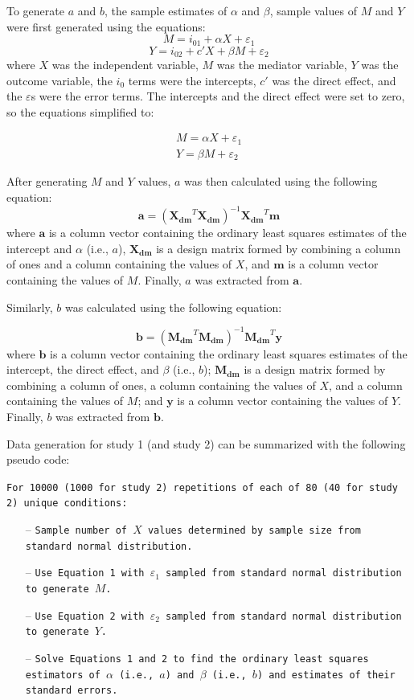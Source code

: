 \documentclass[10,a4paperpaper,]{article}
\begin{document}
To generate \(a\) and \(b\), the sample estimates of \(\alpha\) and
\(\beta\), sample values of \(M\) and \(Y\) were first generated using
the equations: \[M = i_{01} + \alpha X + \varepsilon_1\]
\[Y = i_{02} + c'X + \beta M + \varepsilon_2\] where \(X\) was the
independent variable, \(M\) was the mediator variable, \(Y\) was the
outcome variable, the \(i_0\) terms were the intercepts, \(c'\) was the
direct effect, and the \(\varepsilon\)s were the error terms. The
intercepts and the direct effect were set to zero, so the equations
simplified to:

\begin{gather} 
M = \alpha X + \varepsilon_1 \\
Y = \beta M + \varepsilon_2  
\end{gather}

After generating \(M\) and \(Y\) values, \(a\) was then calculated using
the following equation:
\[\mathbf{a} = (\mathbf{X_{dm}}^T \mathbf{X_{dm}})^{-1}\mathbf{X_{dm}}^T\mathbf{m}\]
where \(\mathbf{a}\) is a column vector containing the ordinary least
squares estimates of the intercept and \(\alpha\) (i.e., \(a\)),
\(\mathbf{X_{dm}}\) is a design matrix formed by combining a column of
ones and a column containing the values of \(X\), and \(\mathbf{m}\) is
a column vector containing the values of \(M\). Finally, \(a\) was
extracted from \(\mathbf{a}\).

Similarly, \(b\) was calculated using the following equation:

\[\mathbf{b} = (\mathbf{M_{dm}}^T \mathbf{M_{dm}})^{-1}\mathbf{M_{dm}}^T\mathbf{y}\]
where \(\mathbf{b}\) is a column vector containing the ordinary least
squares estimates of the intercept, the direct effect, and \(\beta\)
(i.e., \(b\)); \(\mathbf{M_{dm}}\) is a design matrix formed by
combining a column of ones, a column containing the values of \(X\), and
a column containing the values of \(M\); and \(\mathbf{y}\) is a column
vector containing the values of \(Y\). Finally, \(b\) was extracted from
\(\mathbf{b}\).

\begin{minipage}{\linewidth}
Data generation for study 1 (and study 2) can be summarized with the following pseudo code:

\texttt{For 10000 (1000 for study 2) repetitions of each of 80 (40 for study 2) unique conditions:}
\begin{itemize}[leftmargin=*] 
    \item[--] \texttt{Sample number of $X$ values determined by sample size from standard normal distribution.}
    \item[--] \texttt{Use Equation 1 with $\varepsilon_1$ sampled from standard normal distribution to generate $M$.}
    \item[--] \texttt{Use Equation 2 with $\varepsilon_2$ sampled from standard normal distribution to generate $Y$.}
    \item[--] \texttt{Solve Equations 1 and 2 to find the ordinary least squares estimators of $\alpha$ (i.e., $a$) and $\beta$ (i.e., $b$) and estimates of their standard errors.}
\end{itemize}
\end{minipage}
\end{document}
